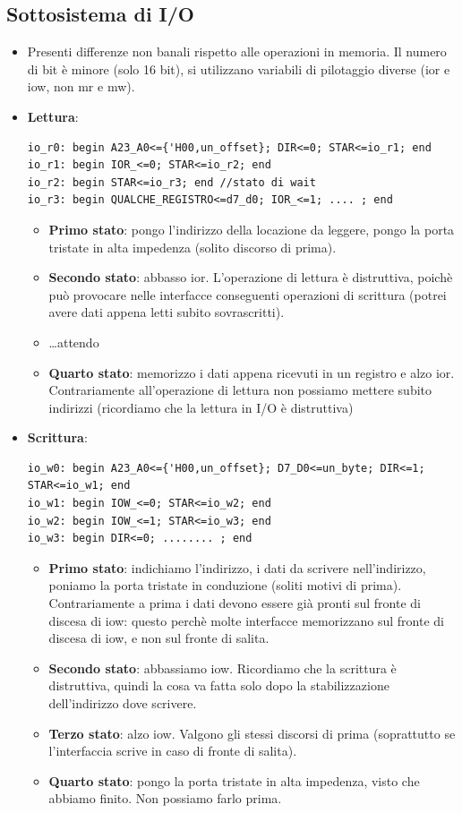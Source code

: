 \documentclass[11pt]{report}
\begin{document}
\subsection{Sottosistema di I/O}
\begin{itemize}
\item Presenti differenze non banali rispetto alle operazioni in memoria. Il numero di bit è minore (solo 16 bit), si utilizzano variabili di pilotaggio diverse (ior e iow, non mr e mw).
\item \textbf{Lettura}:
\begin{verbatim}
io_r0: begin A23_A0<={'H00,un_offset}; DIR<=0; STAR<=io_r1; end
io_r1: begin IOR_<=0; STAR<=io_r2; end
io_r2: begin STAR<=io_r3; end //stato di wait
io_r3: begin QUALCHE_REGISTRO<=d7_d0; IOR_<=1; .... ; end
\end{verbatim}
\begin{itemize}
\item \textbf{Primo stato}: pongo l'indirizzo della locazione da leggere, pongo la porta tristate in alta impedenza (solito discorso di prima).
\item \textbf{Secondo stato}: abbasso ior. L'operazione di lettura è distruttiva, poichè può provocare nelle interfacce conseguenti operazioni di scrittura (potrei avere dati appena letti subito sovrascritti).
\item \dots attendo
\item \textbf{Quarto stato}: memorizzo i dati appena ricevuti in un registro e alzo ior. Contrariamente all'operazione di lettura non possiamo mettere subito indirizzi (ricordiamo che la lettura in I/O è distruttiva)
\end{itemize}
\item \textbf{Scrittura}:
\begin{verbatim}
io_w0: begin A23_A0<={'H00,un_offset}; D7_D0<=un_byte; DIR<=1;
STAR<=io_w1; end
io_w1: begin IOW_<=0; STAR<=io_w2; end
io_w2: begin IOW_<=1; STAR<=io_w3; end
io_w3: begin DIR<=0; ........ ; end
\end{verbatim}
\begin{itemize}
\item \textbf{Primo stato}: indichiamo l'indirizzo, i dati da scrivere nell'indirizzo, poniamo la porta tristate in conduzione (soliti motivi di prima). Contrariamente a prima i dati devono essere già pronti sul fronte di discesa di iow: questo perchè molte interfacce memorizzano sul fronte di discesa di iow, e non sul fronte di salita.
\item \textbf{Secondo stato}: abbassiamo iow. Ricordiamo che la scrittura è distruttiva, quindi la cosa va fatta solo dopo la stabilizzazione dell'indirizzo dove scrivere.
\item \textbf{Terzo stato}: alzo iow. Valgono gli stessi discorsi di prima (soprattutto se l'interfaccia scrive in caso di fronte di salita).
\item \textbf{Quarto stato}: pongo la porta tristate in alta impedenza, visto che abbiamo finito. Non possiamo farlo prima.
\end{itemize}
\end{itemize}
\end{document}
